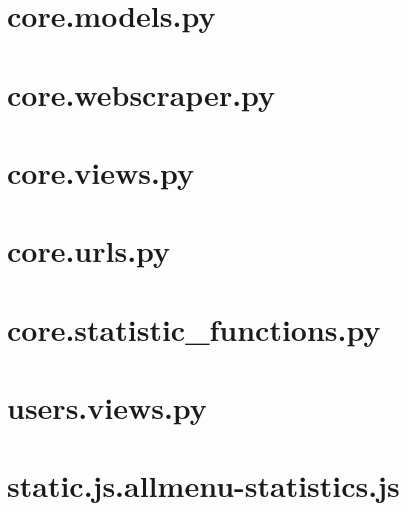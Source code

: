 \section{core.models.py}\label{code:core.models.py}

\section{core.webscraper.py}\label{code:core.webscraper.py}

\section{core.views.py}\label{code:core.views.py}

\section{core.urls.py}\label{code:core.urls.py}

\section{core.statistic\_functions.py}\label{code:core.statistic-functions.py}

\section{users.views.py}\label{code:users.views.py}

\section{static.js.allmenu-statistics.js}\label{code:static.js.allmenu-statistics.js}


